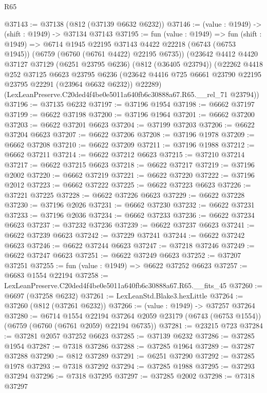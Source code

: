 \begin{lexlean}{R65}
\begin{coremodule}
{@37143 := @37138 (@812 (@37139 @6632 @6232))
@37146 := (value : @1949) -> (shift : @1949) -> @37134 @37143
@37195 := fun (value : @1949) =>
  fun (shift : @1949) =>
  @6714
    @1945
    @22195
    @37143
    @4422
    @22218
    (@6743 (@6753 @1945))
    (@6759 (@6760 (@6761 @4422) @22195 @6735))
    (@23642
      @4412
      @4420
      @37127
      @37129
      (@6251 @23795 @6236)
      (@812 (@36405 @23794))
      (@22262
        @4418
        @252
        @37125
        @6623
        @23795
        @6236
        (@23642 @4416 @725 @6661 @23790 @22195 @23795 @22291 (@23964 @6632 @6232))
        @22289)
      (LexLeanPreserve.C20ded4f4be0e5011a640fb6c30888a67.R65.__rel_71 @23794))
@37196 := @37135 @6232
@37197 := @37196 @1954
@37198 := @6662 @37197
@37199 := @6622 @37198
@37200 := @37196 @1964
@37201 := @6662 @37200
@37203 := @6622 @37201 @6623
@37204 := @37199 @37203
@37206 := @6622 @37204 @6623
@37207 := @6622 @37206
@37208 := @37196 @1978
@37209 := @6662 @37208
@37210 := @6622 @37209
@37211 := @37196 @1988
@37212 := @6662 @37211
@37214 := @6622 @37212 @6623
@37215 := @37210 @37214
@37217 := @6622 @37215 @6623
@37218 := @6622 @37217
@37219 := @37196 @2002
@37220 := @6662 @37219
@37221 := @6622 @37220
@37222 := @37196 @2012
@37223 := @6662 @37222
@37225 := @6622 @37223 @6623
@37226 := @37221 @37225
@37228 := @6622 @37226 @6623
@37229 := @6622 @37228
@37230 := @37196 @2026
@37231 := @6662 @37230
@37232 := @6622 @37231
@37233 := @37196 @2036
@37234 := @6662 @37233
@37236 := @6622 @37234 @6623
@37237 := @37232 @37236
@37239 := @6622 @37237 @6623
@37241 := @6622 @37239 @6623
@37242 := @37229 @37241
@37244 := @6622 @37242 @6623
@37246 := @6622 @37244 @6623
@37247 := @37218 @37246
@37249 := @6622 @37247 @6623
@37251 := @6622 @37249 @6623
@37252 := @37207 @37251
@37255 := fun (value : @1949) => @6622 @37252 @6623
@37257 := @6683 @1554 @22194
@37258 := LexLeanPreserve.C20ded4f4be0e5011a640fb6c30888a67.R65.__fits_45
@37260 := @6697 (@37258 @6232)
@37261 := LexLeanStd.Blake3.hexLittle
@37264 := @37260 (@812 (@37261 @6232))
@37266 := (value : @1949) -> @37257 @37264
@37280 := @6714
    @1554
    @22194
    @37264
    @2059
    @23179
    (@6743 (@6753 @1554))
    (@6759 (@6760 (@6761 @2059) @22194 @6735))
@37281 := @23215 @723
@37284 := @37281 @2057 @37252 @6623
@37285 := @37139 @6232
@37286 := @37285 @1954
@37287 := @7318 @37286
@37288 := @37285 @1964
@37289 := @37287 @37288
@37290 := @812 @37289
@37291 := @6251 @37290
@37292 := @37285 @1978
@37293 := @7318 @37292
@37294 := @37285 @1988
@37295 := @37293 @37294
@37296 := @7318 @37295
@37297 := @37285 @2002
@37298 := @7318 @37297
}
\end{coremodule}
\end{lexlean}
